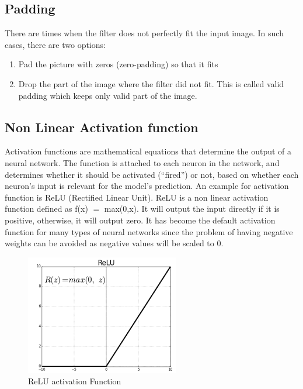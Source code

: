 \subsection{Padding}
There are times when the filter does not perfectly fit the input image. In such cases, there are two options:
\begin{enumerate}
    \item Pad the picture with zeros (zero-padding) so that it fits
    \item Drop the part of the image where the filter did not fit. This is called valid padding which keeps only valid part of the image.
\end{enumerate}

\subsection{Non Linear Activation function}
Activation functions are mathematical equations that determine the output of a neural network. The function is attached to each neuron in the network, and determines whether it should be activated (“fired”) or not, based on whether each neuron's input is relevant for the model's prediction. An example for activation function is ReLU (Rectified Linear Unit). ReLU is a non linear activation function defined as ƒ(x) $=$ max(0,x). It will output the input directly if it is positive, otherwise, it will output zero. It has become the default activation function for many types of neural networks since the problem of having negative weights can be avoided as negative values will be scaled to 0.

\begin{figure}[H]
\centering
	\includegraphics[scale=1]{Chapter2/relu.png}	
	\caption{ReLU activation Function}
	\label{fig:relu}
\end{figure}



